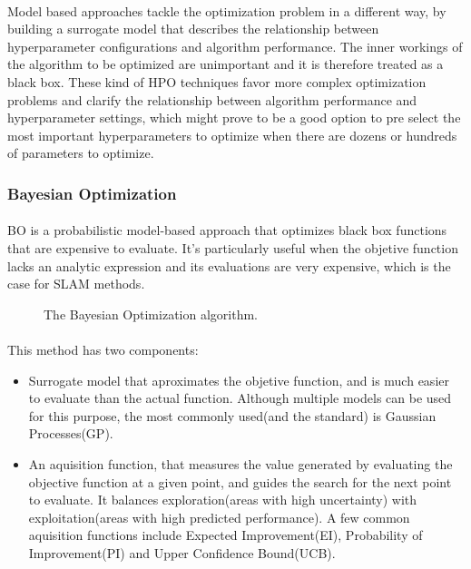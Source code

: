 \paragraph{}Model based approaches tackle the optimization problem in a different way, by building a surrogate model that describes the relationship between hyperparameter configurations and algorithm performance. The inner workings of the algorithm to be optimized are unimportant and it is therefore treated as a black box. These kind of HPO techniques favor more complex optimization problems and clarify the relationship between algorithm performance and hyperparameter settings, which might prove to be a good option to pre select the most important hyperparameters to optimize when there are dozens or hundreds of parameters to optimize.
\subsubsection{Bayesian Optimization}
\paragraph{}\ac{BO} is a probabilistic model-based approach that optimizes black box functions that are expensive to evaluate\cite{mockus1998application}. It's particularly useful when the objetive function lacks an analytic expression and its evaluations are very expensive, which is the case for SLAM methods.


\begin{figure}[h]
    \centering
    
    \caption{The Bayesian Optimization algorithm.}
    \label{fig:enter-label}
\end{figure}

\paragraph{}This method has two components:
\begin{itemize}
    \item Surrogate model that aproximates the objetive function, and is much easier to evaluate than the actual function\cite{elshawi2019automated}. Although multiple models can be used for this purpose, the most commonly used(and the standard) is Gaussian Processes(GP)\cite{bissuel2020hyper}.
    \item An aquisition function, that measures the value generated by evaluating the objective
function at a given point, and guides the search for the next point to evaluate\cite{elshawi2019automated}. It balances exploration(areas with high uncertainty) with exploitation(areas with high predicted performance). A few common aquisition functions include Expected Improvement(EI), Probability of Improvement(PI) and Upper Confidence Bound(UCB).
\end{itemize}

